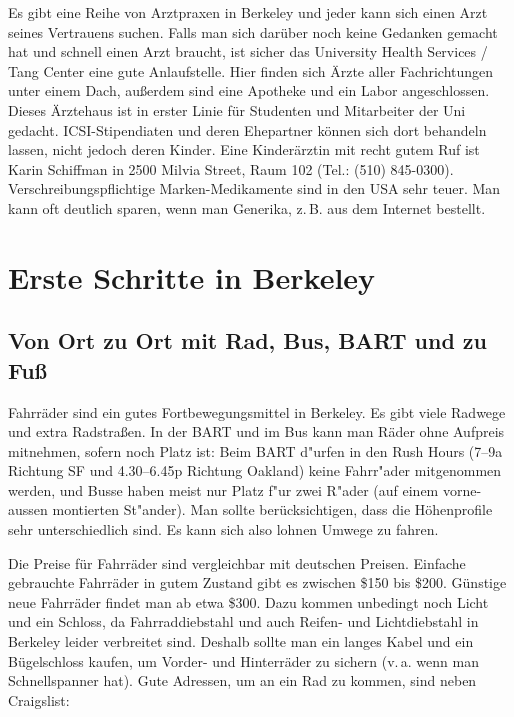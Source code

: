 \documentclass[a4paper]{scrreprt}
\begin{document}
Es gibt eine Reihe von Arztpraxen in Berkeley und jeder kann sich einen Arzt seines Vertrauens suchen. Falls man sich darüber noch keine Gedanken gemacht hat und schnell einen Arzt braucht, ist sicher das University Health Services / Tang Center eine gute Anlaufstelle. Hier finden sich Ärzte aller Fachrichtungen unter einem Dach, außerdem sind eine Apotheke und ein Labor angeschlossen. Dieses Ärztehaus ist in erster Linie für Studenten und Mitarbeiter der Uni gedacht. ICSI-Stipendiaten und deren Ehepartner können sich dort behandeln lassen, nicht jedoch deren Kinder.
Eine Kinderärztin mit recht gutem Ruf ist Karin Schiffman in 2500 Milvia Street, Raum 102 (Tel.: (510) 845-0300). Verschreibungspflichtige Marken-Medikamente sind in den USA sehr teuer. Man kann oft deutlich sparen, wenn man Generika, z.\,B. aus dem Internet bestellt.
 
\chapter{Erste Schritte in Berkeley}

\section{Von Ort zu Ort mit Rad, Bus, BART und zu Fuß}

Fahrräder sind ein gutes Fortbewegungsmittel in Berkeley. 
Es gibt viele Radwege und extra Radstraßen. 
In der BART und im Bus kann man Räder ohne Aufpreis mitnehmen, sofern noch Platz ist: Beim BART d"urfen in den Rush Hours (7--9a Richtung SF und 4.30--6.45p Richtung Oakland) keine Fahrr"ader mitgenommen werden, und Busse haben meist nur Platz f"ur zwei R"ader (auf einem vorne-aussen montierten St"ander).
Man sollte berücksichtigen, dass die Höhenprofile sehr unterschiedlich sind. 
Es kann sich also lohnen Umwege zu fahren.

Die Preise für Fahrräder sind vergleichbar mit deutschen Preisen. 
Einfache gebrauchte Fahrräder in gutem Zustand gibt es zwischen \$150 bis \$200. 
Günstige neue Fahrräder findet man ab etwa \$300. 
Dazu kommen unbedingt noch Licht und ein Schloss, da Fahrraddiebstahl und auch Reifen- und Lichtdiebstahl in Berkeley leider verbreitet sind. 
Deshalb sollte man ein langes Kabel und ein Bügelschloss kaufen, um Vorder- und Hinterräder zu sichern (v.\,a. wenn man Schnellspanner hat). 
Gute Adressen, um an ein Rad zu kommen, sind neben Craigslist:
\end{document}

